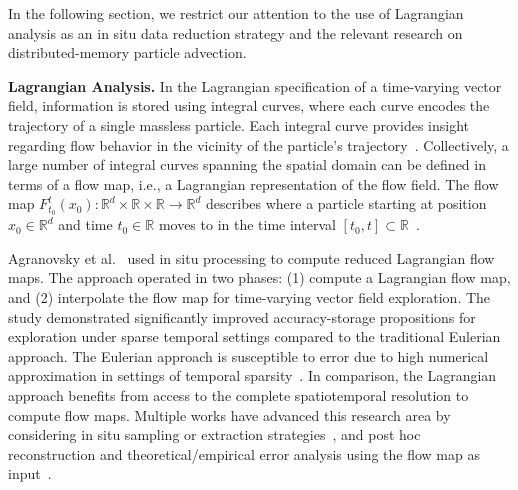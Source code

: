 In the following section, we restrict our attention to the use of Lagrangian analysis as an in situ data reduction strategy and the relevant research on distributed-memory particle advection.

\textbf{Lagrangian Analysis.}
%
In the Lagrangian specification of a time-varying vector field, information is stored using integral curves, where each curve encodes the trajectory of a single massless particle.
%
Each integral curve provides insight regarding flow behavior in the vicinity of the particle's trajectory~\cite{bujack2015lagrangian}.
%
Collectively, a large number of integral curves spanning the spatial domain can be defined in terms of a flow map, i.e., a Lagrangian representation of the flow field.
%
The flow map $F_{t_0}^{t}(x_0):\mathbb R^d \times \mathbb R \times \mathbb R  \to \mathbb R^d$ describes where a particle starting at position $x_0\in \mathbb R^d$ and time $t_0\in \mathbb R$ moves to in the time interval $[t_0,t]\subset \mathbb R$~\cite{garth2007efficient}.
%

Agranovsky et al.~\cite{agranovsky2014improved} used in situ processing to compute reduced Lagrangian flow maps. 
%
The approach operated in two phases: (1) compute a Lagrangian flow map, and (2) interpolate the flow map for time-varying vector field exploration.
%
The study demonstrated significantly improved accuracy-storage propositions for exploration under sparse temporal settings compared to the traditional Eulerian approach.
%
The Eulerian approach is susceptible to error due to high numerical approximation in settings of temporal sparsity~\cite{costa2004lagrangian,Qin2014,agranovsky2014improved,sane2018revisiting}. 
%
In comparison, the Lagrangian approach benefits from access to the complete spatiotemporal resolution to compute flow maps.
%
Multiple works have advanced this research area by considering in situ sampling or extraction strategies~\cite{sane2019interpolation, rapp2019void}, and post hoc reconstruction and theoretical/empirical error analysis using the flow map as input~\cite{hlawatsch2011hierarchical, bujack2015lagrangian, chandler2015interpolation, chandler2016analysis, hummel2016error, sane2018revisiting, sane2019interpolation}.

